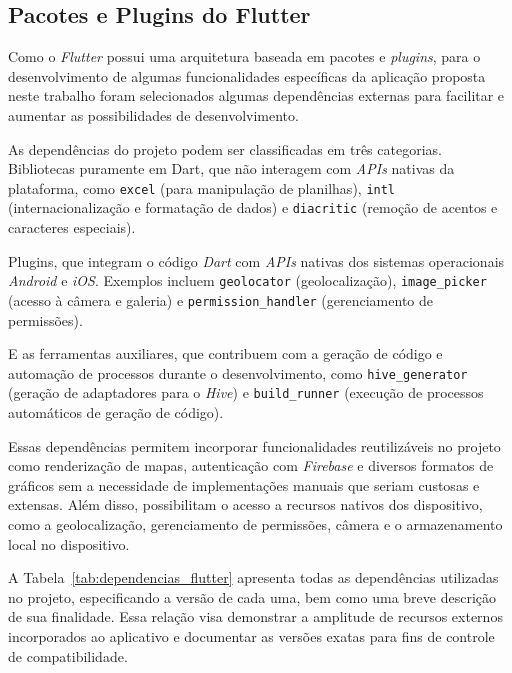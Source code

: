 \subsection{Pacotes e Plugins do Flutter}

Como o \textit{Flutter} possui uma arquitetura baseada em pacotes e \textit{plugins}, para o desenvolvimento de algumas funcionalidades específicas da aplicação proposta neste trabalho foram selecionados algumas dependências externas para facilitar e aumentar as possibilidades de desenvolvimento.

As dependências do projeto podem ser classificadas em três categorias. Bibliotecas puramente em Dart, que não interagem com \textit{APIs} nativas da 
plataforma, como \texttt{excel} (para manipulação de planilhas), \texttt{intl} (internacionalização e formatação de dados) e \texttt{diacritic} (remoção de acentos e caracteres especiais).

Plugins, que integram o código \textit{Dart} com \textit{APIs} nativas dos 
sistemas operacionais \textit{Android} e \textit{iOS}. Exemplos incluem \texttt{geolocator}
 (geolocalização), \texttt{image\_picker} (acesso à câmera e galeria) e \texttt{permission\_handler} (gerenciamento de permissões).

E as ferramentas auxiliares, que contribuem com a geração 
de código e automação de processos durante o desenvolvimento, como \texttt{hive\_generator} 
(geração de adaptadores para o \textit{Hive}) e \texttt{build\_runner} (execução de processos automáticos de geração de código).

Essas dependências permitem incorporar funcionalidades reutilizáveis no projeto 
como renderização de mapas, autenticação com \textit{Firebase} e diversos formatos de gráficos 
sem a necessidade de implementações manuais que seriam custosas e extensas. 
Além disso, possibilitam o acesso a recursos nativos dos dispositivo, como a 
geolocalização, gerenciamento de permissões, câmera e o armazenamento local no dispositivo.

A Tabela~\ref{tab:dependencias_flutter} apresenta todas as dependências utilizadas 
no projeto, especificando a versão de cada uma, bem como uma breve 
descrição de sua finalidade. Essa relação visa demonstrar a amplitude de recursos externos 
incorporados ao aplicativo e documentar as versões exatas para fins de controle de compatibilidade.


